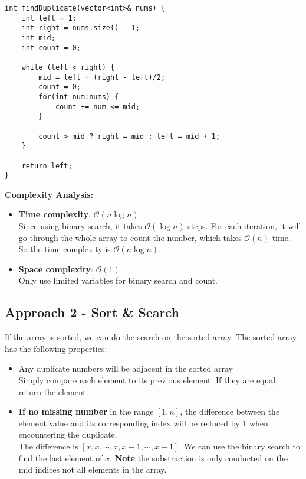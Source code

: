 \documentclass[justified]{tufte-book}
\begin{document}
\begin{lstlisting}
int findDuplicate(vector<int>& nums) {
    int left = 1;
    int right = nums.size() - 1;
    int mid;
    int count = 0;
    
    while (left < right) {
        mid = left + (right - left)/2;
        count = 0;
        for(int num:nums) {
            count += num <= mid;
        }
        
        count > mid ? right = mid : left = mid + 1;
    }
    
    return left;
}
\end{lstlisting}

\noindent \textbf{Complexity Analysis:}
\begin{itemize}
    \item \textbf{Time complexity}: $\mathcal{O}(n\log n)$ \\
    Since using binary search, it takes $\mathcal{O}(\log n)$ steps. For each iteration, it will go through the whole array to count the number, which takes $\mathcal{O}(n)$ time. So the time complexity is $\mathcal{O}(n\log n)$.
    \item \textbf{Space complexity}: $\mathcal{O}(1)$ \\
    Only use limited variables for binary search and count.
\end{itemize}

\subsection{Approach 2 - Sort \& Search}
If the array is sorted, we can do the search on the sorted array. The sorted array has the following properties:
\begin{itemize}
    \item Any duplicate numbers will be adjacent in the sorted array \\
    Simply compare each element to its previous element. If they are equal, return the element. 
    \item \textbf{If no missing number} in the range $[1, n]$, the difference between the element value and its corresponding index will be reduced by 1 when encountering the duplicate. \\
    The difference is $[x, x, \cdots, x, x-1, \cdots, x-1]$. We can use the binary search to find the last element of $x$. \textbf{Note} the substraction is only conducted on the mid indices not all elements in the array. 
\end{itemize}
\end{document}
